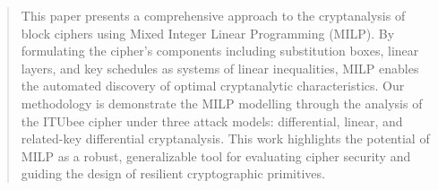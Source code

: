 \begin{abstract}

This paper presents a comprehensive approach to the cryptanalysis of block ciphers using Mixed Integer Linear Programming (MILP). By formulating the cipher’s components including substitution boxes, linear layers, and key schedules as systems of linear inequalities, MILP enables the automated discovery of optimal cryptanalytic characteristics. Our methodology is demonstrate the MILP modelling through the analysis of the ITUbee cipher under three attack models: differential, linear, and related-key differential cryptanalysis. This work highlights the potential of MILP as a robust, generalizable tool for evaluating cipher security and guiding the design of resilient cryptographic primitives.


\end{abstract}